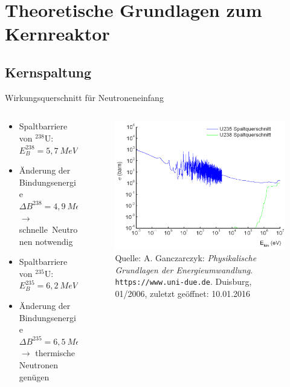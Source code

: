 \documentclass[10pt]{beamer}
\begin{document}
\section{Theoretische Grundlagen zum Kernreaktor}
	\subsection{Kernspaltung}
		\begin{frame}{Wirkungsquerschnitt für Neutroneneinfang}
			\begin{columns}
				\begin{column}[c]{0.6\linewidth}
					\begin{itemize}
						\item Spaltbarriere von $^{238}$U: $E_B^{238} = 5,7\ \unit{MeV}$
						\item Änderung der Bindungsenergie $\Delta B^{238} = 4,9\ \unit{MeV} < E_B^{238}$ \\
						$\rightarrow$ \glqq schnelle\grqq\ Neutronen notwendig
						\item Spaltbarriere von $^{235}$U: $E_B^{235} = 6,2\ \unit{MeV}$
						\item Änderung der Bindungsenergie $\Delta B^{235} = 6,5\ \unit{MeV} > E_B^{238}$\\ 
						$\rightarrow$ thermische Neutronen genügen
					\end{itemize}
				\end{column}
				
				\begin{column}[c]{0.4\linewidth}
					\begin{figure}[ht]
						\centering
						\includegraphics[width=\linewidth]{pic/Wirkungsquerschnitt_Uran}\\
						\tiny{Quelle: A. Ganczarczyk: \textit{Physikalische Grundlagen der Energieumwandlung}. \texttt{https://www.uni-due.de}. Duisburg, 01/2006, zuletzt geöffnet: 10.01.2016}
					\end{figure}
				\end{column}
			\end{columns}	
		\end{frame}
		
\end{document}
